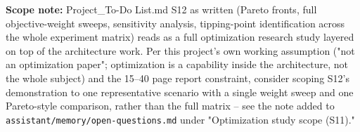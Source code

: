\textbf{Scope note:} Project\_To-Do List.md S12 as written (Pareto fronts,
full objective-weight sweeps, sensitivity analysis, tipping-point
identification across the whole experiment matrix) reads as a full
optimization research study layered on top of the architecture work. Per
this project's own working assumption ("not an optimization paper";
optimization is a capability inside the architecture, not the whole
subject) and the 15--40 page report constraint, consider scoping S12's
demonstration to one representative scenario with a single weight sweep
and one Pareto-style comparison, rather than the full matrix -- see the
note added to \texttt{assistant/memory/open-questions.md} under
"Optimization study scope (S11)."
